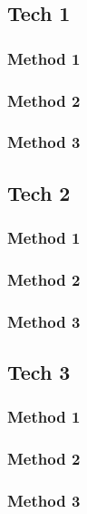 \documentclass[10pt,journal,compsoc,draftclsnofoot]{IEEEtran}
\begin{document}
\begin{flushleft}
\subsection{Tech 1}

\subsubsection{Method 1}

\subsubsection{Method 2}

\subsubsection{Method 3}

\subsection{Tech 2}

\subsubsection{Method 1}

\subsubsection{Method 2}

\subsubsection{Method 3}

\subsection{Tech 3}

\subsubsection{Method 1}

\subsubsection{Method 2}

\subsubsection{Method 3}


\end{flushleft}
\end{document}
